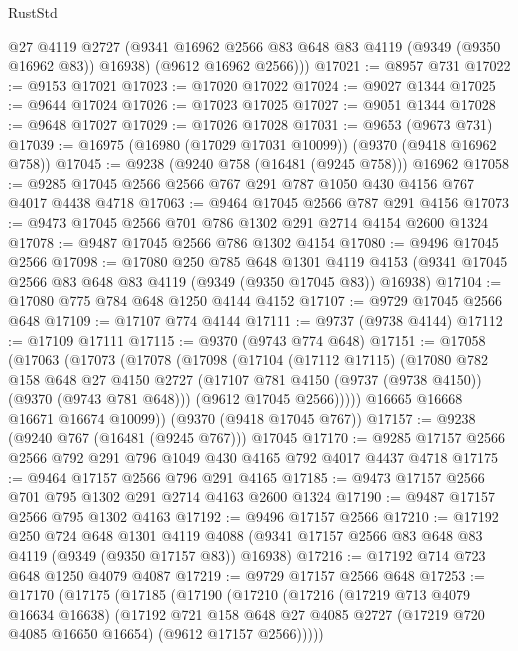 \begin{lexlean}{RustStd}
\begin{coremodule}
        @27
        @4119
        @2727
        (@9341 @16962 @2566 @83 @648 @83 @4119 (@9349 (@9350 @16962 @83)) @16938)
        (@9612 @16962 @2566)))
@17021 := @8957 @731
@17022 := @9153 @17021
@17023 := @17020 @17022
@17024 := @9027 @1344
@17025 := @9644 @17024
@17026 := @17023 @17025
@17027 := @9051 @1344
@17028 := @9648 @17027
@17029 := @17026 @17028
@17031 := @9653 (@9673 @731)
@17039 := @16975 (@16980 (@17029 @17031 @10099)) (@9370 (@9418 @16962 @758))
@17045 := @9238 (@9240 @758 (@16481 (@9245 @758))) @16962
@17058 := @9285 @17045 @2566 @2566 @767 @291 @787 @1050 @430 @4156 @767 @4017 @4438 @4718
@17063 := @9464 @17045 @2566 @787 @291 @4156
@17073 := @9473 @17045 @2566 @701 @786 @1302 @291 @2714 @4154 @2600 @1324
@17078 := @9487 @17045 @2566 @786 @1302 @4154
@17080 := @9496 @17045 @2566
@17098 := @17080
    @250
    @785
    @648
    @1301
    @4119
    @4153
    (@9341 @17045 @2566 @83 @648 @83 @4119 (@9349 (@9350 @17045 @83)) @16938)
@17104 := @17080 @775 @784 @648 @1250 @4144 @4152
@17107 := @9729 @17045 @2566 @648
@17109 := @17107 @774 @4144
@17111 := @9737 (@9738 @4144)
@17112 := @17109 @17111
@17115 := @9370 (@9743 @774 @648)
@17151 := @17058
    (@17063
      (@17073
        (@17078
          (@17098
            (@17104
              (@17112 @17115)
              (@17080
                @782
                @158
                @648
                @27
                @4150
                @2727
                (@17107 @781 @4150 (@9737 (@9738 @4150)) (@9370 (@9743 @781 @648)))
                (@9612 @17045 @2566)))))
        @16665
        @16668
        @16671
        @16674
        @10099))
    (@9370 (@9418 @17045 @767))
@17157 := @9238 (@9240 @767 (@16481 (@9245 @767))) @17045
@17170 := @9285 @17157 @2566 @2566 @792 @291 @796 @1049 @430 @4165 @792 @4017 @4437 @4718
@17175 := @9464 @17157 @2566 @796 @291 @4165
@17185 := @9473 @17157 @2566 @701 @795 @1302 @291 @2714 @4163 @2600 @1324
@17190 := @9487 @17157 @2566 @795 @1302 @4163
@17192 := @9496 @17157 @2566
@17210 := @17192
    @250
    @724
    @648
    @1301
    @4119
    @4088
    (@9341 @17157 @2566 @83 @648 @83 @4119 (@9349 (@9350 @17157 @83)) @16938)
@17216 := @17192 @714 @723 @648 @1250 @4079 @4087
@17219 := @9729 @17157 @2566 @648
@17253 := @17170
    (@17175
      (@17185
        (@17190
          (@17210
            (@17216
              (@17219 @713 @4079 @16634 @16638)
              (@17192
                @721
                @158
                @648
                @27
                @4085
                @2727
                (@17219 @720 @4085 @16650 @16654)
                (@9612 @17157 @2566)))))

\end{coremodule}
\end{lexlean}
